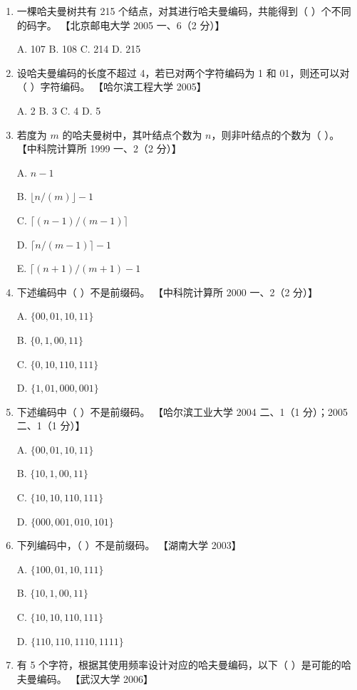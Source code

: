\documentclass[lang=cn,newtx,10pt,scheme=chinese]{../../elegantbook}
\begin{document}
\begin{enumerate}
    \item 一棵哈夫曼树共有 215 个结点，对其进行哈夫曼编码，共能得到（ ）个不同的码字。  
    【北京邮电大学 2005 一、6（2 分）】  

    A. 107 \quad B. 108 \quad C. 214 \quad D. 215  

    \item 设哈夫曼编码的长度不超过 4，若已对两个字符编码为 1 和 01，则还可以对（ ）字符编码。  
    【哈尔滨工程大学 2005】  

    A. 2 \quad B. 3 \quad C. 4 \quad D. 5  

    \item 若度为 $m$ 的哈夫曼树中，其叶结点个数为 $n$，则非叶结点的个数为（ ）。  
    【中科院计算所 1999 一、2（2 分）】  

    A. $n - 1$ \quad 
    
    B. $\lfloor n / (m) \rfloor - 1$  

    C. $\lceil (n - 1) / (m - 1) \rceil$ \quad 
    
    D. $\lceil n  / (m - 1) \rceil - 1$  

    E. $\lceil(n + 1)/(m + 1)-1$
    \item 下述编码中（ ）不是前缀码。  
    【中科院计算所 2000 一、2（2 分）】  

    A. $\{00, 01, 10, 11\}$  

    B. $\{0, 1, 00, 11\}$  

    C. $\{0, 10, 110, 111\}$  

    D. $\{1, 01, 000, 001\}$  

    \item 下述编码中（ ）不是前缀码。  
    【哈尔滨工业大学 2004 二、1（1 分）；2005 二、1（1 分）】  

    A. $\{00, 01, 10, 11\}$  

    B. $\{10, 1, 00, 11\}$  

    C. $\{10, 10, 110, 111\}$  

    D. $\{000, 001, 010, 101\}$  

    \item 下列编码中，（ ）不是前缀码。  
    【湖南大学 2003】  

    A. $\{100, 01, 10, 111\}$  

    B. $\{10, 1, 00, 11\}$  

    C. $\{10, 10, 110, 111\}$  

    D. $\{110, 110, 1110, 1111\}$  

    \item 有 5 个字符，根据其使用频率设计对应的哈夫曼编码，以下（ ）是可能的哈夫曼编码。  
    【武汉大学 2006】  


\end{enumerate}
\end{document}
